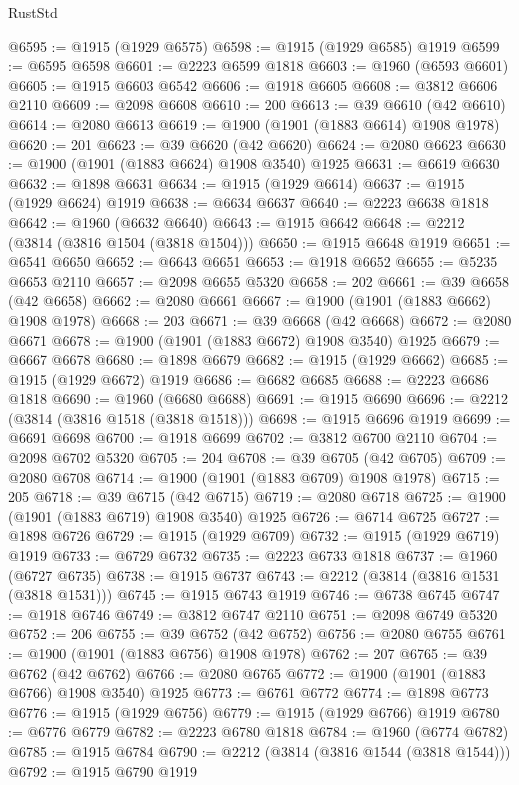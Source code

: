 \begin{lexlean}{RustStd}
\begin{coremodule}
@6595 := @1915 (@1929 @6575)
@6598 := @1915 (@1929 @6585) @1919
@6599 := @6595 @6598
@6601 := @2223 @6599 @1818
@6603 := @1960 (@6593 @6601)
@6605 := @1915 @6603 @6542
@6606 := @1918 @6605
@6608 := @3812 @6606 @2110
@6609 := @2098 @6608
@6610 := 200
@6613 := @39 @6610 (@42 @6610)
@6614 := @2080 @6613
@6619 := @1900 (@1901 (@1883 @6614) @1908 @1978)
@6620 := 201
@6623 := @39 @6620 (@42 @6620)
@6624 := @2080 @6623
@6630 := @1900 (@1901 (@1883 @6624) @1908 @3540) @1925
@6631 := @6619 @6630
@6632 := @1898 @6631
@6634 := @1915 (@1929 @6614)
@6637 := @1915 (@1929 @6624) @1919
@6638 := @6634 @6637
@6640 := @2223 @6638 @1818
@6642 := @1960 (@6632 @6640)
@6643 := @1915 @6642
@6648 := @2212 (@3814 (@3816 @1504 (@3818 @1504)))
@6650 := @1915 @6648 @1919
@6651 := @6541 @6650
@6652 := @6643 @6651
@6653 := @1918 @6652
@6655 := @5235 @6653 @2110
@6657 := @2098 @6655 @5320
@6658 := 202
@6661 := @39 @6658 (@42 @6658)
@6662 := @2080 @6661
@6667 := @1900 (@1901 (@1883 @6662) @1908 @1978)
@6668 := 203
@6671 := @39 @6668 (@42 @6668)
@6672 := @2080 @6671
@6678 := @1900 (@1901 (@1883 @6672) @1908 @3540) @1925
@6679 := @6667 @6678
@6680 := @1898 @6679
@6682 := @1915 (@1929 @6662)
@6685 := @1915 (@1929 @6672) @1919
@6686 := @6682 @6685
@6688 := @2223 @6686 @1818
@6690 := @1960 (@6680 @6688)
@6691 := @1915 @6690
@6696 := @2212 (@3814 (@3816 @1518 (@3818 @1518)))
@6698 := @1915 @6696 @1919
@6699 := @6691 @6698
@6700 := @1918 @6699
@6702 := @3812 @6700 @2110
@6704 := @2098 @6702 @5320
@6705 := 204
@6708 := @39 @6705 (@42 @6705)
@6709 := @2080 @6708
@6714 := @1900 (@1901 (@1883 @6709) @1908 @1978)
@6715 := 205
@6718 := @39 @6715 (@42 @6715)
@6719 := @2080 @6718
@6725 := @1900 (@1901 (@1883 @6719) @1908 @3540) @1925
@6726 := @6714 @6725
@6727 := @1898 @6726
@6729 := @1915 (@1929 @6709)
@6732 := @1915 (@1929 @6719) @1919
@6733 := @6729 @6732
@6735 := @2223 @6733 @1818
@6737 := @1960 (@6727 @6735)
@6738 := @1915 @6737
@6743 := @2212 (@3814 (@3816 @1531 (@3818 @1531)))
@6745 := @1915 @6743 @1919
@6746 := @6738 @6745
@6747 := @1918 @6746
@6749 := @3812 @6747 @2110
@6751 := @2098 @6749 @5320
@6752 := 206
@6755 := @39 @6752 (@42 @6752)
@6756 := @2080 @6755
@6761 := @1900 (@1901 (@1883 @6756) @1908 @1978)
@6762 := 207
@6765 := @39 @6762 (@42 @6762)
@6766 := @2080 @6765
@6772 := @1900 (@1901 (@1883 @6766) @1908 @3540) @1925
@6773 := @6761 @6772
@6774 := @1898 @6773
@6776 := @1915 (@1929 @6756)
@6779 := @1915 (@1929 @6766) @1919
@6780 := @6776 @6779
@6782 := @2223 @6780 @1818
@6784 := @1960 (@6774 @6782)
@6785 := @1915 @6784
@6790 := @2212 (@3814 (@3816 @1544 (@3818 @1544)))
@6792 := @1915 @6790 @1919

\end{coremodule}
\end{lexlean}
